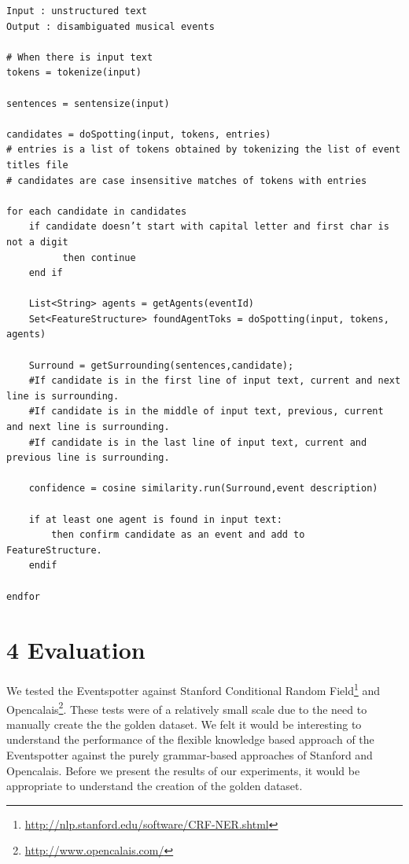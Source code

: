 \documentclass[a4paper,11pt]{report}
\begin{document}
\begin{lstlisting}
Input : unstructured text 
Output : disambiguated musical events

# When there is input text 
tokens = tokenize(input)

sentences = sentensize(input)

candidates = doSpotting(input, tokens, entries)
# entries is a list of tokens obtained by tokenizing the list of event titles file
# candidates are case insensitive matches of tokens with entries

for each candidate in candidates
	if candidate doesn’t start with capital letter and first char is not a digit
          then continue
	end if

    List<String> agents = getAgents(eventId)
	Set<FeatureStructure> foundAgentToks = doSpotting(input, tokens, agents)	
	
	Surround = getSurrounding(sentences,candidate);
	#If candidate is in the first line of input text, current and next line is surrounding.
	#If candidate is in the middle of input text, previous, current and next line is surrounding.
	#If candidate is in the last line of input text, current and previous line is surrounding.
	
	confidence = cosine similarity.run(Surround,event description)
	
    if at least one agent is found in input text:       
		then confirm candidate as an event and add to FeatureStructure.
	endif
	
endfor

\end{lstlisting}




\chapter*{4 Evaluation}
We tested the Eventspotter against Stanford Conditional Random Field\footnote{\url{http://nlp.stanford.edu/software/CRF-NER.shtml}} and Opencalais\footnote{\url{http://www.opencalais.com/}}. These tests were of a relatively small scale due to the need to manually create the the golden dataset. We felt it would be interesting to understand the performance of the flexible knowledge based approach of the Eventspotter against the purely grammar-based approaches of Stanford and Opencalais. Before we present the results of our experiments, it would be appropriate to understand the creation of the golden dataset.
\end{document}
